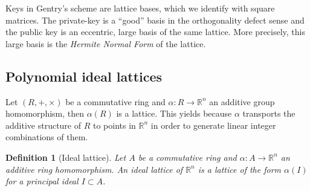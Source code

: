 \documentclass[11pt]{article}
\theoremstyle{plain}
\newtheorem{DEF}{Definition}[section]
\theoremstyle{definition}
\theoremstyle{remark}
\newcommand{\RR}{\mathbb{R}}      %
\newcommand{\ZZ}{\mathbb{Z}}      %
\newcommand{\bb}{{\mbox{\bf b}}}
\begin{document}
Keys in Gentry's scheme are lattice bases, which we identify with square matrices. The private-key is a ``good'' basis in the orthogonality defect sense and the public key is an eccentric, large basis of the same lattice. More precisely, this large basis is the {\it Hermite Normal Form} of the lattice.
\subsection{Polynomial ideal lattices}

Let $(R,+,\times)$ be a commutative ring and $\alpha:R\to \RR^n$ an additive group homomorphism, then $\alpha(R)$ is a lattice. This yields because $\alpha$ transports the additive structure of $R$ to points in $\RR^n$ in order to generate linear integer combinations of them.
\begin{DEF}[Ideal lattice]
	Let $A$ be a commutative ring and $\alpha:A\to \RR^n$ an additive ring homomorphism. An {\it ideal lattice} of $\RR^n$ is a lattice of the form $\alpha(I)$ for a principal ideal $I\subset A$.
\end{DEF}	
\end{document}
